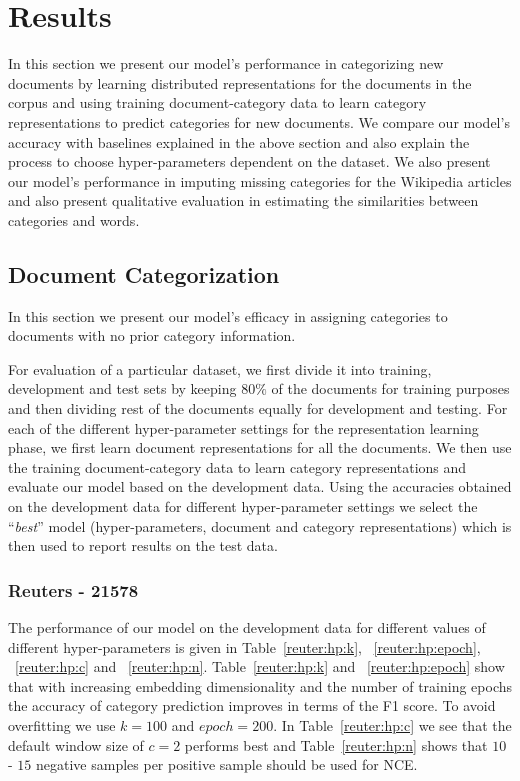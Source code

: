 \section{Results}
\label{sec:results}
In this section we present our model's performance in categorizing new documents by learning distributed representations for the documents in the corpus and using training document-category data to learn category representations to predict categories for new documents. We compare our model's accuracy with baselines explained in the above section and also explain the process to choose hyper-parameters dependent on the dataset. 
We also present our model's performance in imputing missing categories for the Wikipedia articles and also present qualitative evaluation in estimating the similarities between categories and words. 

\subsection{Document Categorization}
\label{sec:results:categorization}
In this section we present our model's efficacy in assigning categories to documents with no prior category information. 

For evaluation of a particular dataset, we first divide it into training, development and test sets by keeping $80\%$ of the documents for training purposes and then dividing rest of the documents equally for development and testing. For each of the different hyper-parameter settings for the representation learning phase, we first learn document representations for all the documents. We then use the training document-category data to learn category representations and evaluate our model based on the development data. Using the accuracies obtained on the development data for different hyper-parameter settings we select the ``\emph{best}'' model (hyper-parameters, document and category representations) which is then used to report results on the test data.

\subsubsection{Reuters - 21578}
The performance of our model on the development data for different values of different hyper-parameters is given in Table~\ref{reuter:hp:k}, ~\ref{reuter:hp:epoch}, ~\ref{reuter:hp:c} and ~\ref{reuter:hp:n}. Table~\ref{reuter:hp:k} and ~\ref{reuter:hp:epoch} show that with increasing embedding dimensionality and the number of training epochs the accuracy of category prediction improves in terms of the F1 score. To avoid overfitting we use $k = 100$ and $epoch = 200$. In Table~\ref{reuter:hp:c} we see that the default window size of $c=2$ performs best and Table~\ref{reuter:hp:n} shows that $10$ - $15$ negative samples per positive sample should be used for NCE.

